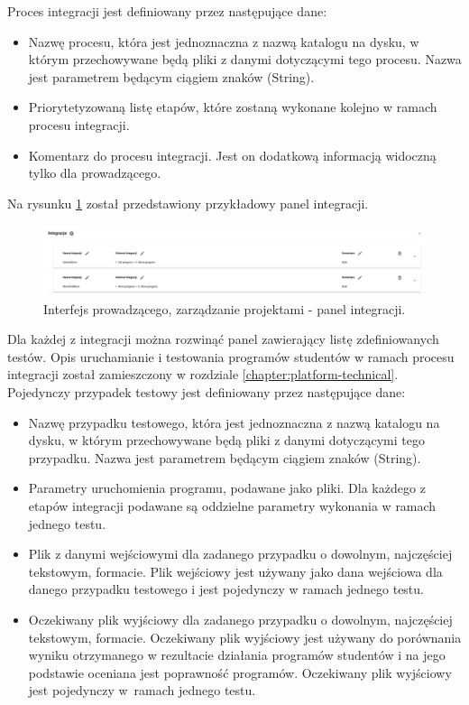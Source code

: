 Proces integracji jest definiowany przez następujące dane:
\begin {itemize}
    \item Nazwę procesu, która jest jednoznaczna z nazwą katalogu na dysku, w którym przechowywane będą pliki z danymi dotyczącymi tego procesu.
    Nazwa jest parametrem będącym ciągiem znaków (String).
    \item Priorytetyzowaną listę etapów, które zostaną wykonane kolejno w ramach procesu integracji.
    \item Komentarz do procesu integracji.
    Jest on dodatkową informacją widoczną tylko dla prowadzącego.
\end {itemize}

Na rysunku \ref{fig:lecturer_integrations} został przedstawiony przykładowy panel integracji.

\begin{figure}[h]
    \centering
    \includegraphics[width = 15cm]{chapter04/lecturer_integrations.png}
    \caption{Interfejs prowadzącego, zarządzanie projektami - panel integracji.}
    \label{fig:lecturer_integrations}
\end{figure}

Dla każdej z integracji można rozwinąć panel zawierający listę zdefiniowanych testów.
Opis uruchamianie i testowania programów studentów w ramach procesu integracji został zamieszczony w rozdziale \ref{chapter:platform-technical}.
Pojedynczy przypadek testowy jest definiowany przez następujące dane:
\begin {itemize}
    \item Nazwę przypadku testowego, która jest jednoznaczna z nazwą katalogu na dysku, w którym przechowywane będą pliki z danymi dotyczącymi tego przypadku.
    Nazwa jest parametrem będącym ciągiem znaków (String).
    \item Parametry uruchomienia programu, podawane jako pliki.
    Dla każdego z etapów integracji podawane są oddzielne parametry wykonania w ramach jednego testu.
    \item Plik z danymi wejściowymi dla zadanego przypadku o dowolnym, najczęściej tekstowym, formacie.
    Plik wejściowy jest używany jako dana wejściowa dla danego przypadku testowego i jest pojedynczy w ramach jednego testu.
    \item Oczekiwany plik wyjściowy dla zadanego przypadku o dowolnym, najczęściej tekstowym, formacie.
    Oczekiwany plik wyjściowy jest używany do porównania wyniku otrzymanego w rezultacie działania programów studentów i na jego podstawie oceniana jest poprawność programów.
    Oczekiwany plik wyjściowy jest pojedynczy w~ramach jednego testu.
\end {itemize}

